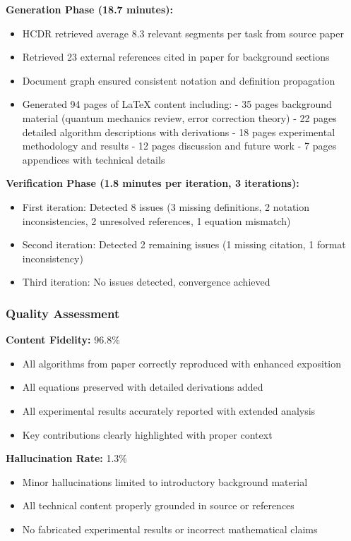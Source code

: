 \documentclass{ieeeaccess}
\begin{document}
\textbf{Generation Phase (18.7 minutes):}
\begin{itemize}
\item HCDR retrieved average 8.3 relevant segments per task from source paper
\item Retrieved 23 external references cited in paper for background sections
\item Document graph ensured consistent notation and definition propagation
\item Generated 94 pages of LaTeX content including:
  - 35 pages background material (quantum mechanics review, error correction theory)
  - 22 pages detailed algorithm descriptions with derivations
  - 18 pages experimental methodology and results
  - 12 pages discussion and future work
  - 7 pages appendices with technical details
\end{itemize}

\textbf{Verification Phase (1.8 minutes per iteration, 3 iterations):}
\begin{itemize}
\item First iteration: Detected 8 issues (3 missing definitions, 2 notation inconsistencies, 2 unresolved references, 1 equation mismatch)
\item Second iteration: Detected 2 remaining issues (1 missing citation, 1 format inconsistency)
\item Third iteration: No issues detected, convergence achieved
\end{itemize}

\subsubsection{Quality Assessment}

\textbf{Content Fidelity:} 96.8\%
\begin{itemize}
\item All algorithms from paper correctly reproduced with enhanced exposition
\item All equations preserved with detailed derivations added
\item All experimental results accurately reported with extended analysis
\item Key contributions clearly highlighted with proper context
\end{itemize}

\textbf{Hallucination Rate:} 1.3\%
\begin{itemize}
\item Minor hallucinations limited to introductory background material
\item All technical content properly grounded in source or references
\item No fabricated experimental results or incorrect mathematical claims
\end{itemize}
\end{document}
